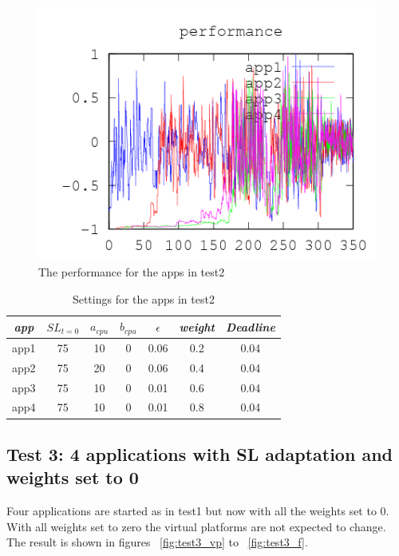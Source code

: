 \documentclass[nobiblatex]{LTHthesis}
\begin{document}
\begin{figure}[!H]
  \centering
  \includegraphics{"tools/plot/logs/test2/f"}
  \caption{The performance for the apps in test2}
  \label{fig:test2_f}
\end{figure}

\begin{table}[h]
  \centering
  \begin{tabular}{|c|c|c|c|c|c|c|}
 	\hline 
   \emph{app} & $SL_{t=0}$ & \textbf{$a_{cpu}$} & \textbf{$b_{cpu}$} & \textbf{$\epsilon$} & \emph{weight} & \emph{Deadline} \\ \hline
	app1 & 75 & 10 & 0 & 0.06 & 0.2 &0.04  \\ \hline
	app2 & 75 & 20 & 0 & 0.06 & 0.4 &0.04  \\ \hline
	app3 & 75 & 10 & 0 & 0.01 & 0.6 &0.04  \\ \hline
	app4 & 75 & 10 & 0 & 0.01 & 0.8 &0.04  \\ \hline        
  \end{tabular}
  \caption{Settings for the apps in test2}
  \label{tab:settings_test2}
\end{table}




\subsection{Test 3: 4 applications with SL adaptation and weights set to 0}
Four applications are started as in test1 but now with all the weights set to 0.
With all weights set to zero the virtual platforms are not expected to change.
The result is shown in figures ~\ref{fig:test3_vp} to ~\ref{fig:test3_f}. 
\end{document}
